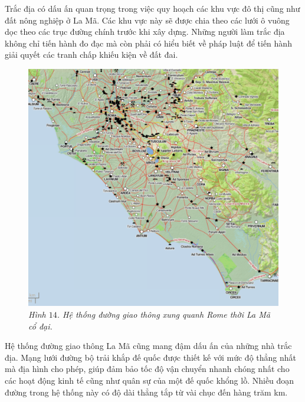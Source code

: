 \begin{multicols}{2}
	Trắc địa có dấu ấn quan trọng trong việc quy hoạch các khu vực đô thị cũng như đất nông nghiệp ở La Mã. Các khu vực này sẽ được chia theo các lưới ô vuông dọc theo các trục đường chính trước khi xây dựng. Những người làm trắc địa không chỉ tiến hành đo đạc mà còn phải có hiểu biết về pháp luật để tiến hành giải quyết các tranh chấp khiếu kiện về đất đai.
	\begin{figure}[H]
		\vspace*{-5pt}
		\centering
		\captionsetup{labelformat= empty, justification=centering}
		\includegraphics[height= 0.7\linewidth]{14}
		\caption{\small\textit{\color{toanhocdoisong}Hình $14$. Hệ thống đường giao thông xung quanh Rome thời La Mã cổ đại.}}
		\vspace*{-10pt}
	\end{figure}
	Hệ thống đường giao thông La Mã cũng mang đậm dấu ấn của những nhà trắc địa. Mạng lưới đường bộ trải khắp đế quốc được thiết kế với mức độ thẳng nhất mà địa hình cho phép, giúp đảm bảo tốc độ vận chuyển nhanh chóng nhất cho các hoạt động kinh tế cũng như quân sự của một đế quốc khổng lồ. Nhiều đoạn đường trong hệ thống này có độ dài thẳng tắp từ vài chục đến hàng trăm km.
	

\end{multicols}
